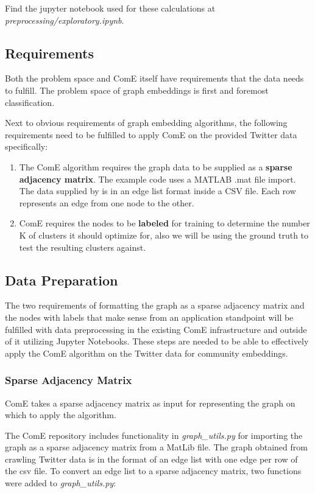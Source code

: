 \documentclass[sigconf]{acmart}
\begin{document}
Find the jupyter notebook used for these calculations at \textit{preprocessing/exploratory.ipynb}.

\subsection{Requirements}

Both the problem space and ComE itself have requirements that the data needs to fulfill. The problem space of graph embeddings is first and foremost classification.

Next to obvious requirements of graph embedding algorithms, the following requirements need to be fulfilled to apply ComE on the provided Twitter data specifically:

\begin{enumerate}
	\item The ComE algorithm requires the graph data to be supplied as a \textbf{sparse adjacency matrix}. The example code uses a MATLAB .mat file import. The data supplied by \citeauthor{TwitterData} is in an edge list format inside a CSV file. Each row represents an edge from one node to the other.
	\item ComE requires the nodes to be \textbf{labeled} for training to determine the number K of clusters it should optimize for, also we will be using the ground truth to test the resulting clusters against.
\end{enumerate}

\subsection{Data Preparation}

The two requirements of formatting the graph as a sparse adjacency matrix and the nodes with labels that make sense from an application standpoint will be fulfilled with data preprocessing in the existing ComE infrastructure and outside of it utilizing Jupyter Notebooks. These steps are needed to be able to effectively apply the ComE algorithm on the Twitter data for community embeddings.

\subsubsection{Sparse Adjacency Matrix}
ComE takes a sparse adjacency matrix as input for representing the graph on which to apply the algorithm.

The ComE repository includes functionality in \textit{graph\_utils.py} for importing the graph as a sparse adjacency matrix from a MatLib file.\cite{ComE} The graph obtained from crawling Twitter data is in the format of an edge list with one edge per row of the csv file. To convert an edge list to a sparse adjacency matrix, two functions were added to \textit{graph\_utils.py}:
\end{document}
